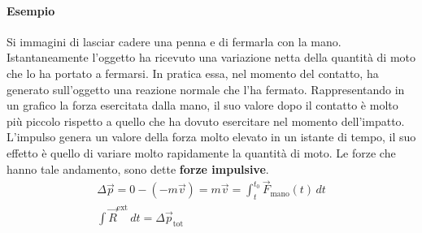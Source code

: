 \documentclass[10pt,a4paper]{book}
\begin{document}
\begin{figure}[htpb]
\end{figure}
\FloatBarrier

\paragraph{Esempio} Si immagini di lasciar cadere una penna e di fermarla con la mano. Istantaneamente l'oggetto ha ricevuto una variazione netta della quantità di moto che lo ha portato a fermarsi. In pratica essa, nel momento del contatto, ha generato sull'oggetto una reazione normale che l'ha fermato. Rappresentando in un grafico la forza esercitata dalla mano, il suo valore dopo il contatto è molto più piccolo rispetto a quello che ha dovuto esercitare nel momento dell'impatto. L'impulso genera un valore della forza molto elevato in un istante di tempo, il suo effetto è quello di variare molto rapidamente la quantità di moto. Le forze che hanno tale andamento, sono dette \textbf{forze impulsive}.
\begin{gather*}
	\Delta \vec{p}=0-(-m\vec{v})=m\vec{v}=\int_t^{t_0} \vec{F}_\text{mano} (t)\,dt \\
	\int\vec{R}^\text{ext} \,dt=\Delta \vec{p}_\text{tot}
\end{gather*}
\end{document}
